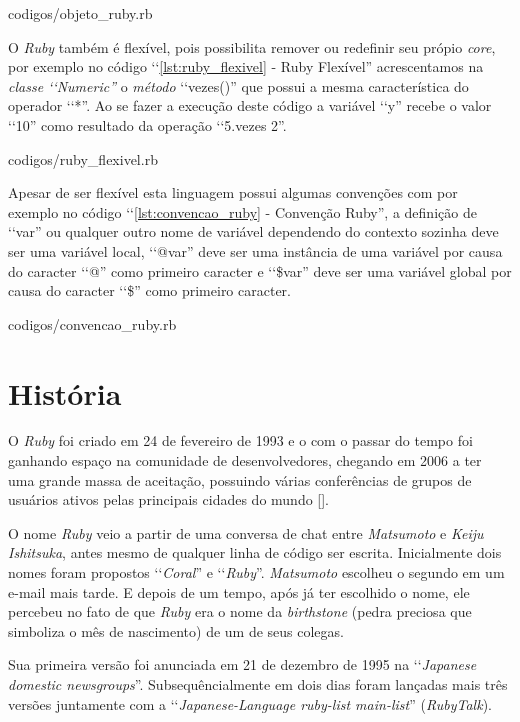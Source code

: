 
{codigos/objeto_ruby.rb}

O \emph{Ruby} também é flexível, pois possibilita remover ou redefinir seu própio \emph{core}, por 
exemplo no código ‘‘\ref{lst:ruby_flexivel} - Ruby Flexível'' acrescentamos na \emph{classe ‘‘Numeric''} 
o \emph{método} ‘‘vezes()'' que possui a mesma característica do operador ‘‘*''. Ao se fazer a execução 
deste código a variável ‘‘y'' recebe o valor ‘‘10'' como resultado da operação ‘‘5.vezes 2''.


{codigos/ruby_flexivel.rb}

Apesar de ser flexível esta linguagem possui algumas convenções com por exemplo no código 
‘‘\ref{lst:convencao_ruby} - Convenção Ruby'', a definição de ‘‘var'' ou qualquer outro nome de 
variável dependendo do contexto sozinha deve ser uma variável local, ‘‘@var'' deve ser uma instância 
de uma variável por causa do caracter ‘‘@'' como primeiro caracter e ‘‘\$var'' deve ser uma variável global 
por causa do caracter ‘‘\$'' como primeiro caracter.


{codigos/convencao_ruby.rb}

\section{História}
\label{história_ruby}

O \emph{Ruby} foi criado em 24 de fevereiro de 1993 e o com o passar do tempo foi ganhando espaço na 
comunidade de desenvolvedores, chegando em 2006 a ter uma grande massa de aceitação, possuindo várias 
conferências de grupos de usuários ativos pelas principais cidades do mundo [].

O nome \emph{Ruby} veio a partir de uma conversa de chat entre \emph{Matsumoto} e \emph{Keiju Ishitsuka}, 
antes mesmo de qualquer linha de código ser escrita. Inicialmente dois nomes foram propostos ‘‘\emph{Coral}'' 
e ‘‘\emph{Ruby}''. \emph{Matsumoto} escolheu o segundo em um e-mail mais tarde. E depois de um tempo, após 
já ter escolhido o nome, ele percebeu no fato de que \emph{Ruby} era o nome da \emph{birthstone} (pedra 
preciosa que simboliza o mês de nascimento) de um de seus colegas.

Sua primeira versão foi anunciada em 21 de dezembro de 1995 na ‘‘\emph{Japanese domestic newsgroups}''. 
Subsequêncialmente em dois dias foram lançadas mais três versões juntamente com a
‘‘\emph{Japanese-Language ruby-list main-list}'' (\emph{RubyTalk}).

